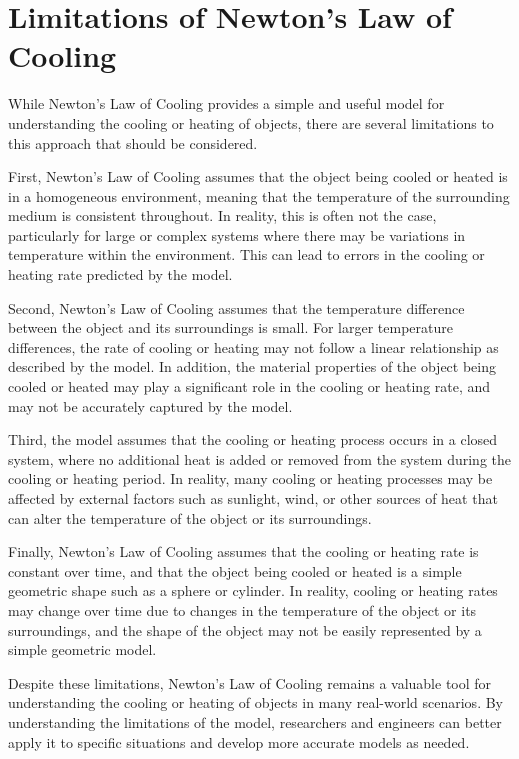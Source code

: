 \documentclass[12pt, a4paper]{article}
\begin{document}
\section{Limitations of Newton's Law of Cooling}

While Newton's Law of Cooling provides a simple and useful model for understanding the cooling or heating of objects, there are several limitations to this approach that should be considered.

First, Newton's Law of Cooling assumes that the object being cooled or heated is in a homogeneous environment, meaning that the temperature of the surrounding medium is consistent throughout. In reality, this is often not the case, particularly for large or complex systems where there may be variations in temperature within the environment. This can lead to errors in the cooling or heating rate predicted by the model.

Second, Newton's Law of Cooling assumes that the temperature difference between the object and its surroundings is small. For larger temperature differences, the rate of cooling or heating may not follow a linear relationship as described by the model. In addition, the material properties of the object being cooled or heated may play a significant role in the cooling or heating rate, and may not be accurately captured by the model.

Third, the model assumes that the cooling or heating process occurs in a closed system, where no additional heat is added or removed from the system during the cooling or heating period. In reality, many cooling or heating processes may be affected by external factors such as sunlight, wind, or other sources of heat that can alter the temperature of the object or its surroundings.

Finally, Newton's Law of Cooling assumes that the cooling or heating rate is constant over time, and that the object being cooled or heated is a simple geometric shape such as a sphere or cylinder. In reality, cooling or heating rates may change over time due to changes in the temperature of the object or its surroundings, and the shape of the object may not be easily represented by a simple geometric model.

Despite these limitations, Newton's Law of Cooling remains a valuable tool for understanding the cooling or heating of objects in many real-world scenarios. By understanding the limitations of the model, researchers and engineers can better apply it to specific situations and develop more accurate models as needed.
\end{document}
